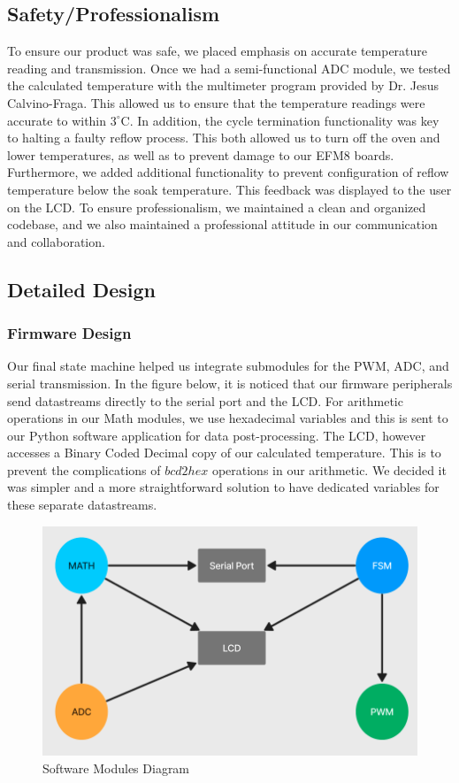 \documentclass{article}
\begin{document}
\subsection{Safety/Professionalism}

To ensure our product was safe, we placed emphasis on accurate temperature reading and transmission. Once we had a semi-functional ADC module, we tested the calculated temperature
with the multimeter program provided by Dr. Jesus Calvino-Fraga. This allowed us to ensure that the temperature readings were accurate to within $3^\circ\text{C}$. In addition, the
cycle termination functionality was key to halting a faulty reflow process. This both allowed us to turn off the oven and lower temperatures, as well as to prevent damage to our EFM8 boards. Furthermore,
we added additional functionality to prevent configuration of reflow temperature below the soak temperature. This feedback was displayed to the user on the LCD.
To ensure professionalism, we maintained a clean and organized codebase, and we also maintained a professional attitude in our communication and collaboration.

\subsection{Detailed Design}

\subsubsection{Firmware Design}

Our final state machine helped us integrate submodules for the PWM, ADC, and serial transmission. In the figure below, it is noticed that our firmware peripherals send datastreams directly to the serial port and the LCD. For arithmetic operations in our Math modules, we use hexadecimal variables and this is sent to our Python software application for data post-processing. The LCD, however accesses a Binary Coded Decimal copy of our calculated temperature. This is to prevent the complications of $bcd2hex$ operations in our arithmetic. We decided it was simpler and a more straightforward solution to have dedicated variables for these separate datastreams.

\begin{figure}[H]
  \centering
  \includegraphics[width=0.8\linewidth]{Figures/Software_Modules.png}
  \caption{Software Modules Diagram}
  \label{fig:Software Modules}
\end{figure}
\end{document}

